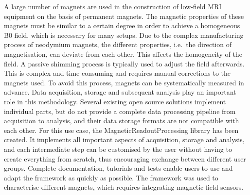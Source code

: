 A large number of magnets are used in the construction of low-field MRI
equipment on the basis of permanent magnets. The magnetic properties of
these magnets must be similar to a certain degree in order to achieve a
homogeneous B0 field, which is necessary for many setups. Due to the
complex manufacturing process of neodymium magnets, the different
properties, i.e.~the direction of magnetisation, can deviate from each
other. This affects the homogeneity of the field. A passive shimming
process is typically used to adjust the field afterwards. This is
complex and time-consuming and requires manual corrections to the
magnets used. To avoid this process, magnets can be systematically
measured in advance. Data acquisition, storage and subsequent analysis
play an important role in this methodology. Several existing open source
solutions implement individual parts, but do not provide a complete data
processing pipeline from acquisition to analysis, and their data storage
formats are not compatible with each other. For this use case, the
MagneticReadoutProcessing library has been created. It implements all
important aspects of acquisition, storage and analysis, and each
intermediate step can be customised by the user without having to create
everything from scratch, thus encouraging exchange between different
user groups. Complete documentation, tutorials and tests enable users to
use and adapt the framework as quickly as possible. The framework was
used to characterise different magnets, which requires integrating
magnetic field sensors.
